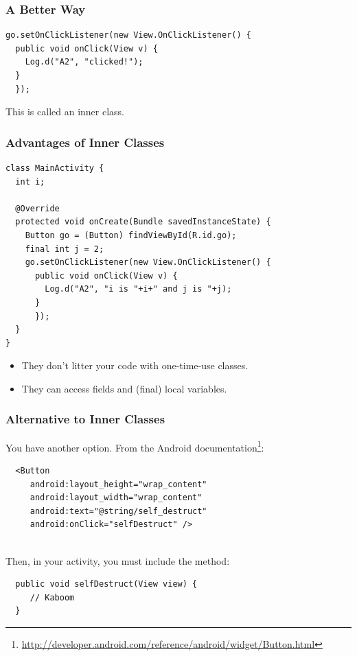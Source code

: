 \begin{frame}[fragile]
\frametitle{A Better Way}

\begin{changemargin}{1cm}

{\small
\begin{verbatim}
go.setOnClickListener(new View.OnClickListener() {
  public void onClick(View v) {
    Log.d("A2", "clicked!");
  }
  }); 
\end{verbatim}
}

{\Large This is called an \alert{inner class}.}

\end{changemargin}
\end{frame}

\begin{frame}[fragile]
\frametitle{Advantages of Inner Classes}

{\small
\begin{verbatim}
class MainActivity {
  int i;

  @Override
  protected void onCreate(Bundle savedInstanceState) {
    Button go = (Button) findViewById(R.id.go);
    final int j = 2;
    go.setOnClickListener(new View.OnClickListener() {
      public void onClick(View v) {
        Log.d("A2", "i is "+i+" and j is "+j);
      }
      }); 
  }
}
\end{verbatim}
}

\begin{changemargin}{1cm}
\begin{itemize}
\item They don't litter your code with one-time-use classes.
\item They can access fields and (final) local variables.
\end{itemize}
\end{changemargin}

\end{frame}

\begin{frame}[fragile]
\frametitle{Alternative to Inner Classes}

\begin{changemargin}{1cm}
You have another option. From the Android documentation\footnote{\tiny \url{http://developer.android.com/reference/android/widget/Button.html}}:
\begin{verbatim}
  <Button
     android:layout_height="wrap_content"
     android:layout_width="wrap_content"
     android:text="@string/self_destruct"
     android:onClick="selfDestruct" />
\end{verbatim}
~\\[1em]

Then, in your activity, you must include the method:
\begin{verbatim}
  public void selfDestruct(View view) {
     // Kaboom
  }
\end{verbatim}
\end{changemargin}

\end{frame}

